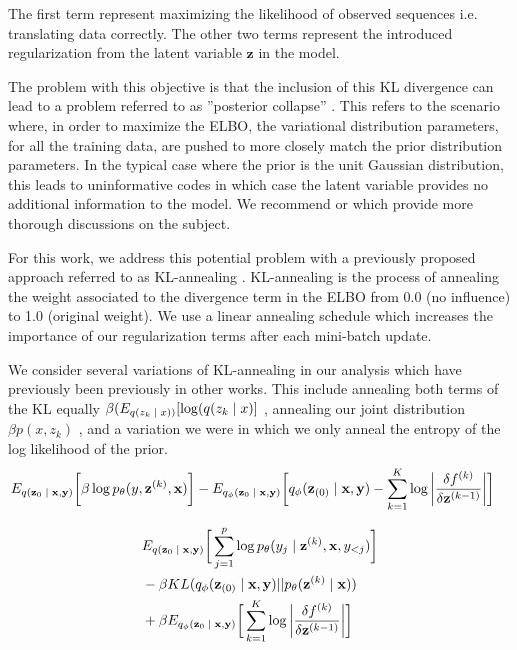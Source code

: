 The first term represent maximizing the likelihood of observed sequences i.e. translating data correctly. The other two terms represent the introduced regularization from the latent variable $\textbf{z}$ in the model. 

The problem with this objective is that the inclusion of this KL divergence can lead to a problem referred to as ''posterior collapse'' \cite{he2018lagging}. This refers to the scenario where, in order to maximize the ELBO, the variational distribution parameters, for all the training data, are pushed to more closely match the prior distribution parameters. In the typical case where the prior is the unit Gaussian distribution, this leads to uninformative codes in which case the latent variable provides no additional information to the model. We recommend \citet{chen2016VariationalLossyAE} or \citet{zhao2017InfoVAE} which provide more thorough discussions on the subject. 

 

For this work, we address this potential problem with a previously proposed approach referred to as KL-annealing \cite{bowman2015GeneratingSent,sonderby2016LadderVAE}. KL-annealing is the process of annealing the weight associated to the divergence term in the ELBO from 0.0 (no influence) to 1.0 (original weight). We use a linear annealing schedule which increases the importance of our regularization terms after each mini-batch update. 

We consider several variations of KL-annealing in our analysis which have previously been previously in other works. This include annealing both terms of the KL equally  $\beta (E_{q(z_{k} \; | \;{x}))}[\log(q(z_{k} \; | \;{x})]$ , annealing our joint distribution $\beta p(x, z_{k})$ , and a variation we were in which we only anneal the entropy of the log likelihood of the prior. 
\begin{align}
\begin{split}
&
E_{q(\textbf{z}_{0}\; | \;{\textbf{x}, \textbf{y}})} \bigg[ \beta \log p_{\theta}(y, \textbf{z}^{(k)}, \textbf{x}) \bigg]  - E_{q_{\phi}(\textbf{z}_{0} \; | \;{\textbf{x}, \textbf{y}})} \bigg[q_{\phi}(\textbf{z}_{(0)} \; | \;{\textbf{x}, \textbf{y}}) - \sum_{k=1}^{K} \log \bigg|\frac{\delta f^{(k)}}{\delta \textbf{z}^{(k-1)}} \bigg| \bigg]  
\end{split}
\end{align}

\begin{align}
\begin{split}\label{eq:2}
&
E_{q(\textbf{z}_{0}\; | \;{\textbf{x}, \textbf{y}})} \bigg[ \sum_{j=1}^{p} \log p_{\theta}(y_{j} \; | \;{\textbf{z}^{(k)}}, \textbf{x}, y_{<j}) \bigg] \\
& - \beta KL(q_{\phi}(\textbf{z}_{(0)} \; | \;{\textbf{x}, \textbf{y}}) || p_{\theta}(\textbf{z}^{(k)} \; | \;{\textbf{x}})) \\
&   +  \beta E_{q_{\phi}(\textbf{z}_{0} \; | \;{\textbf{x}, \textbf{y}})} \bigg[\sum_{k=1}^{K} \log \bigg|\frac{\delta f^{(k)}}{\delta \textbf{z}^{(k-1)}} \bigg| \bigg]  
\end{split}
\end{align}


